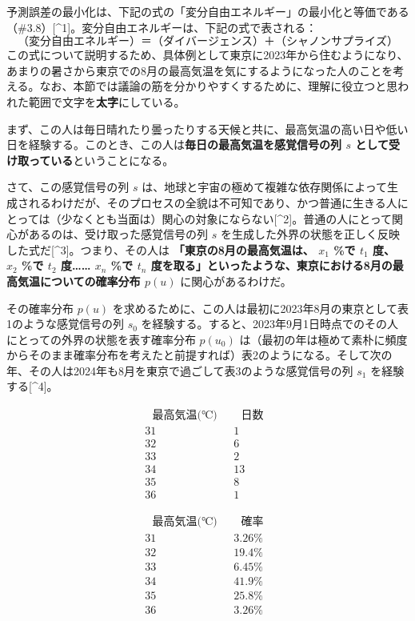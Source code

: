 予測誤差の最小化は、下記の式の「変分自由エネルギー」の最小化と等価である（\#3.8）{[}\^{}1{]}。変分自由エネルギーは、下記の式で表される：
\[
（変分自由エネルギー）＝（ダイバージェンス）＋（シャノンサプライズ）\tag{1}
\]
この式について説明するため、具体例として東京に2023年から住むようになり、あまりの暑さから東京での8月の最高気温を気にするようになった人のことを考える。なお、本節では議論の筋を分かりやすくするために、理解に役立つと思われた範囲で文字を\textbf{太字}にしている。

まず、この人は毎日晴れたり曇ったりする天候と共に、最高気温の高い日や低い日を経験する。このとき、この人は\textbf{毎日の最高気温を感覚信号の列
\(s\) として受け取っている}ということになる。

さて、この感覚信号の列 \(s\)
は、地球と宇宙の極めて複雑な依存関係によって生成されるわけだが、そのプロセスの全貌は不可知であり、かつ普通に生きる人にとっては（少なくとも当面は）関心の対象にならない{[}\^{}2{]}。普通の人にとって関心があるのは、受け取った感覚信号の列
\(s\)
を生成した外界の状態を正しく反映した式だ{[}\^{}3{]}。つまり、その人は
\textbf{「東京の8月の最高気温は、 \(x_1\) \%で \(t_1\) 度、 \(x_2\) \%で
\(t_2\) 度\ldots\ldots{} \(x_n\) \%で \(t_n\)
度を取る」といったような、東京における8月の最高気温についての確率分布
\(p(u)\)} に関心があるわけだ。

その確率分布 \(p(u)\)
を求めるために、この人は最初に2023年8月の東京として表1のような感覚信号の列
\(s_0\)
を経験する。すると、2023年9月1日時点でのその人にとっての外界の状態を表す確率分布
\(p(u_0)\)
は（最初の年は極めて素朴に頻度からそのまま確率分布を考えたと前提すれば）表2のようになる。そして次の年、その人は2024年も8月を東京で過ごして表3のような感覚信号の列
\(s_1\) を経験する{[}\^{}4{]}。

\[
\begin{array}{cc}
~~~\textrm{最高気温(℃)}~~~ & ~~~\textrm{日数}~~~ \\
\hline
\textrm{31} & \textrm{1} \\
\textrm{32} & \textrm{6} \\
\textrm{33} & \textrm{2} \\
\textrm{34} & \textrm{13} \\
\textrm{35} & \textrm{8} \\
\textrm{36} & \textrm{1}
\end{array}
\tag{表1}
\]

\[
\begin{array}{cc}
~~~\textrm{最高気温(℃)}~~~ & ~~~\textrm{確率}~~~ \\
\hline
\textrm{31} & \textrm{3.26\%} \\
\textrm{32} & \textrm{19.4\%} \\
\textrm{33} & \textrm{6.45\%} \\
\textrm{34} & \textrm{41.9\%} \\
\textrm{35} & \textrm{25.8\%} \\
\textrm{36} & \textrm{3.26\%}
\end{array}
\tag{表2}
\]

